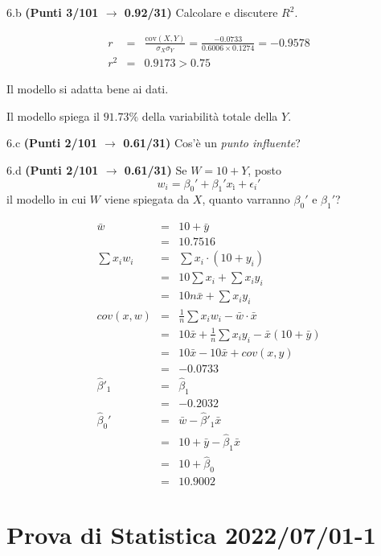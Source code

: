 \documentclass[
  11pt,
]{book}
\theoremstyle{mytheoremstyle}
\theoremstyle{mydefstyle}
\newenvironment{sol}
  {
  \begin{tcolorbox}[enhanced,breakable,arc=0.1mm,boxrule=1pt,colback=white,colframe=iblue,
  title=\bf \fontfamily{lmss}\selectfont \hspace{.5 cm} Soluzione,drop fuzzy shadow]

}{
\end{tcolorbox}
  }
\begin{document}
6.b \textbf{(Punti 3/101 \(\rightarrow\) 0.92/31)} Calcolare e discutere \(R^2\).

\begin{sol}
\begin{eqnarray*}
r&=&\frac{\text{cov}(X,Y)}{\sigma_X\sigma_Y}=\frac{ -0.0733 }{ 0.6006 \times 0.1274 }= -0.9578 \\ 
r^2&=& 0.9173 > 0.75
\end{eqnarray*}

Il modello si adatta bene ai dati.

Il modello spiega il \(91.73\%\) della variabilità totale della \(Y\).

\end{sol}

6.c \textbf{(Punti 2/101 \(\rightarrow\) 0.61/31)} Cos'è un \emph{punto influente}?

6.d \textbf{(Punti 2/101 \(\rightarrow\) 0.61/31)} Se \(W=10+ Y\), posto
\[w_i=\beta_0'+\beta_1'x_ì +\epsilon_i'\]
il modello in cui \(W\) viene spiegata da \(X\),
quanto varranno \(\beta_0'\) e \(\beta_1'\)?

\begin{sol}
\begin{eqnarray*}
  \bar w &=& 10+ \bar y\\
  &=& 10.7516\\
  \sum x_iw_i&=&\sum x_i\cdot (10+y_i)\\
  &=& 10\sum x_i +\sum x_i y_i\\
  &=& 10n\bar x +\sum x_i y_i\\
  cov(x,w)&=&\frac 1n\sum x_iw_i-\bar w\cdot\bar x\\
  &=&10\bar x +\frac 1n\sum x_i y_i-\bar x(10+\bar y)\\
  &=&10 \bar x - 10 \bar x +cov(x,y) \\
  &=& -0.0733\\
  \hat\beta'_1&=&\hat\beta_1\\
  &=&-0.2032\\
  \hat\beta_0'&=& \bar w -\hat\beta'_1\bar x\\
  &=& 10+\bar y-\hat\beta_1\bar x\\
  &=&10+\hat\beta_0\\
  &=&10.9002
\end{eqnarray*}

\end{sol}

\section{Prova di Statistica 2022/07/01-1}\label{prova-di-statistica-20220701-1}
\end{document}
